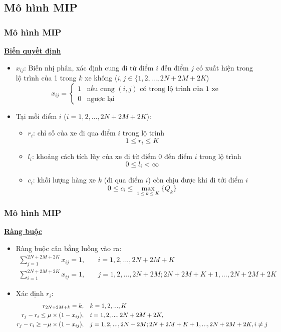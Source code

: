 \documentclass{beamer}
\begin{document}
	\subsection{Mô hình MIP}
	\begin{frame}
		\frametitle{Mô hình MIP}
	\textbf{\underline{Biến quyết định}}
	\begin{itemize}
		\item $x_{ij}$: Biến nhị phân, xác định cung đi từ điểm $i$ đến điểm $j$ có xuất hiện trong lộ trình của 1 trong $k$ xe không ($i,j\in \{1,2,...,2N+2M+2K$)
		\begin{equation}
		x_{ij} = 
		\begin{cases}
		1 & \text{nếu cung $(i,j)$ có trong lộ trình của 1 xe}\\
		0 & \text{ngược lại}
		\end{cases}
		\end{equation}
		\item Tại mỗi điểm $i$ ($i=1,2,...,2N+2M+2K$):
		\begin{itemize}
			\item $r_i$: chỉ số của xe đi qua điểm $i$ trong lộ trình
			\begin{equation}
				1\leq r_i\leq K
			\end{equation}
			\item $l_i$: khoảng cách tích lũy của xe đi từ điểm $0$ đến điểm $i$ trong lộ trình
			\begin{equation}
				0\leq l_i < \infty
			\end{equation}
			\item $c_i$: khối lượng hàng xe $k$ (đi qua điểm $i$) còn chịu được khi đi tới điểm $i$
			\begin{equation}
				0\leq c_i\leq \max _{1\leq k\leq K} \{Q_k\}
			\end{equation}
		\end{itemize}
	\end{itemize}
		
	\end{frame}
	\begin{frame}
		\frametitle{Mô hình MIP}
		\textbf{\underline{Ràng buộc}}
		\begin{itemize}
			\item Ràng buộc cân bằng luồng vào ra:
			\begin{align}
					\sum_{j=1}^{2N+2M+2K} x_{ij} = 1,\quad & i=1,2,...,2N+2M+K \\
				\sum_{i=1}^{2N+2M+2K} x_{ij} = 1,\quad & j=1,2,...,2N+2M;2N+2M+K+1,...,2N+2M+2K
			\end{align}
			\item Xác định $r_i$:
			\begin{align}
				r_{2N+2M+k} = k,\quad & k=1,2,...,K \\
				r_j - r_i\leq \mu\times (1 - x_{ij}),\quad & i=1,2,...,2N+2M+2K, \\
				r_j - r_i\geq -\mu\times (1 -x_{ij}),\quad & j=1,2,...,2N+2M;2N+2M+K+1,...,2N+2M+2K, i\ne j \notag
			\end{align}
		\end{itemize}
	\end{frame}
\end{document}
